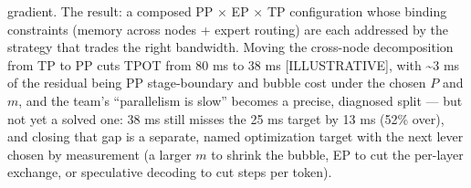 gradient. The result: a composed PP × EP × TP configuration whose
binding constraints (memory across nodes + expert routing) are each
addressed by the strategy that trades the right bandwidth. Moving the
cross-node decomposition from TP to PP cuts TPOT from 80 ms to 38 ms
\mbox{{[}ILLUSTRATIVE{]}}, with \textasciitilde3 ms of the residual being PP
stage-boundary and bubble cost under the chosen \(P\) and \(m\), and the
team's ``parallelism is slow'' becomes a precise, diagnosed split ---
but not yet a solved one: 38 ms still misses the 25 ms target by 13 ms
(52\% over), and closing that gap is a separate, named optimization
target with the next lever chosen by measurement (a larger \(m\) to
shrink the bubble, EP to cut the per-layer exchange, or speculative
decoding to cut steps per token).

